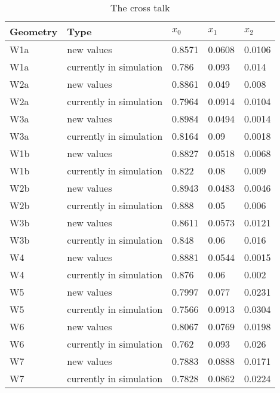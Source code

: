 \begin{table}[h]
\begin{center}
\begin{tabular}{|l|l|l|l|l|}
\hline
Geometry & Type & $x_{0}$ & $x_{1}$ & $x_{2}$ \\
\hline
\hline
W1a &  new values & 0.8571 & 0.0608 & 0.0106 \\
W1a &  currently in simulation & 0.786 & 0.093 & 0.014 \\
\hline
W2a &  new values & 0.8861 & 0.049 & 0.008 \\
W2a &  currently in simulation & 0.7964 & 0.0914 & 0.0104 \\
\hline
W3a &  new values & 0.8984 & 0.0494 & 0.0014 \\
W3a &  currently in simulation & 0.8164 & 0.09 & 0.0018 \\
\hline
W1b &  new values & 0.8827 & 0.0518 & 0.0068 \\
W1b &  currently in simulation & 0.822 & 0.08 & 0.009 \\
\hline
W2b &  new values & 0.8943 & 0.0483 & 0.0046 \\
W2b &  currently in simulation & 0.888 & 0.05 & 0.006 \\
\hline
W3b &  new values & 0.8611 & 0.0573 & 0.0121 \\
W3b &  currently in simulation & 0.848 & 0.06 & 0.016 \\
\hline
W4 &  new values & 0.8881 & 0.0544 & 0.0015 \\
W4 &  currently in simulation & 0.876 & 0.06 & 0.002 \\
\hline
W5 &  new values & 0.7997 & 0.077 & 0.0231 \\
W5 &  currently in simulation & 0.7566 & 0.0913 & 0.0304 \\
\hline
W6 &  new values & 0.8067 & 0.0769 & 0.0198 \\
W6 &  currently in simulation & 0.762 & 0.093 & 0.026 \\
\hline
W7 &  new values & 0.7883 & 0.0888 & 0.0171 \\
W7 &  currently in simulation & 0.7828 & 0.0862 & 0.0224 \\
\hline
\end{tabular}
\caption[Table caption text]{The cross talk  }
\label{tab:measuredXtalkTODTEC}
\end{center}
\end{table}


